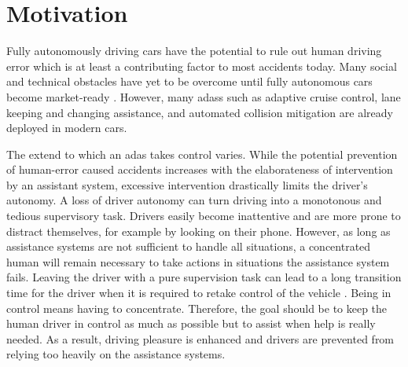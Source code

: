 \fi

%
%


\section{Motivation}

Fully autonomously driving cars have the potential to rule out human driving error which is at least a contributing factor to most accidents today. Many social and technical obstacles have yet to be overcome until fully autonomous cars become market-ready \parencite{autonomous_driving_book}. However, many \glspl{adas} such as adaptive cruise control, lane keeping and changing assistance, and automated collision mitigation are already deployed in modern cars. 

The extend to which an \gls{adas} takes control varies. While the potential prevention of human-error caused accidents increases with the elaborateness of intervention by an assistant system, excessive intervention drastically limits the driver's autonomy. A loss of driver autonomy can turn driving into a monotonous and tedious supervisory task. Drivers easily become inattentive and are more prone to distract themselves, for example by looking on their phone. However, as long as assistance systems are not sufficient to handle all situations, a concentrated human will remain necessary to take actions in situations the assistance system fails. Leaving the driver with a pure supervision task can lead to a long transition time for the driver when it is required to retake control of the vehicle \parencite{shared_control}. Being in control means having to concentrate. Therefore, the goal should be to keep the human driver in control as much as possible but to assist when help is really needed. As a result, driving pleasure is enhanced and drivers are prevented from relying too heavily on the assistance systems.



